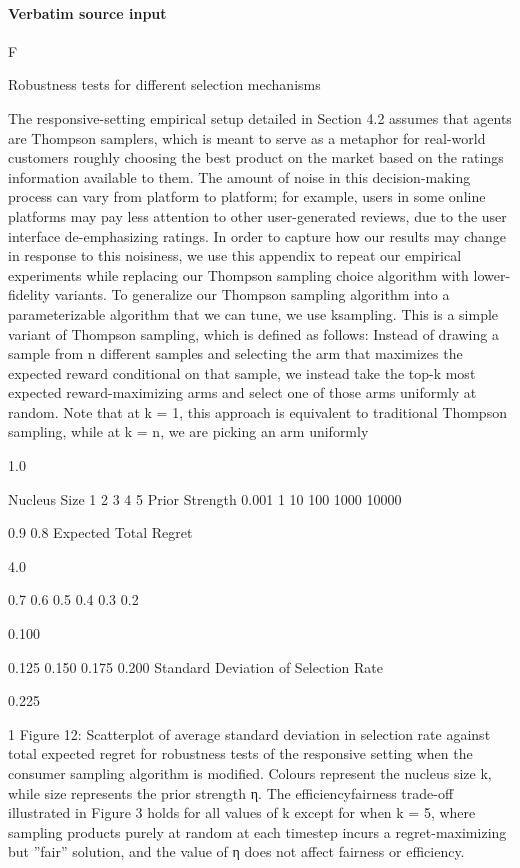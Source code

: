 \documentclass[10pt]{article}
\begin{document}
\paragraph{Verbatim source input}
\begin{ReviewVerbatim}
F

Robustness tests for different selection
mechanisms

The responsive-setting empirical setup detailed in Section
4.2 assumes that agents are Thompson samplers, which
is meant to serve as a metaphor for real-world customers
roughly choosing the best product on the market based on
the ratings information available to them. The amount of
noise in this decision-making process can vary from platform to platform; for example, users in some online platforms may pay less attention to other user-generated reviews, due to the user interface de-emphasizing ratings. In
order to capture how our results may change in response to
this noisiness, we use this appendix to repeat our empirical
experiments while replacing our Thompson sampling choice
algorithm with lower-fidelity variants.
To generalize our Thompson sampling algorithm into
a parameterizable algorithm that we can tune, we use ksampling. This is a simple variant of Thompson sampling,
which is defined as follows: Instead of drawing a sample
from n different samples and selecting the arm that maximizes the expected reward conditional on that sample, we instead take the top-k most expected reward-maximizing arms
and select one of those arms uniformly at random. Note that
at k = 1, this approach is equivalent to traditional Thompson
sampling, while at k = n, we are picking an arm uniformly

1.0

Nucleus Size
1
2
3
4
5
Prior Strength
0.001
1
10
100
1000
10000

0.9
0.8
Expected Total Regret

4.0

0.7
0.6
0.5
0.4
0.3
0.2

0.100

0.125
0.150
0.175
0.200
Standard Deviation of Selection Rate

0.225

1
Figure 12: Scatterplot of average
standard deviation in selection rate against total expected regret for robustness tests
of the responsive setting when the consumer sampling algorithm is modified. Colours represent the nucleus size k,
while size represents the prior strength η. The efficiencyfairness trade-off illustrated in Figure 3 holds for all values
of k except for when k = 5, where sampling products purely
at random at each timestep incurs a regret-maximizing but
”fair” solution, and the value of η does not affect fairness or
efficiency.


\end{ReviewVerbatim}
\end{document}
